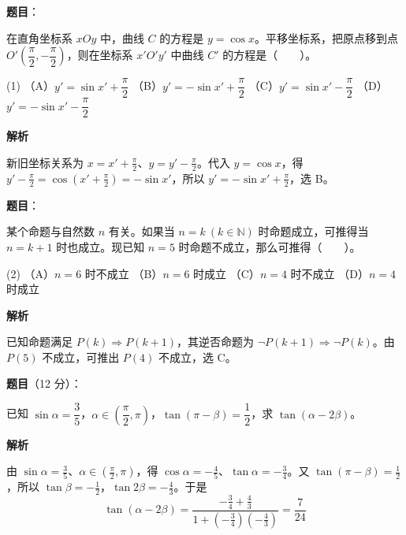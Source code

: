 \begin{answer}

\textbf{题目}：

在直角坐标系 \(xOy\) 中，曲线 \(C\) 的方程是 \(y=\cos x\)。平移坐标系，把原点移到点 \(O\prime\left(\dfrac\pi2,-\dfrac\pi2\right)\)，则在坐标系 \(x\prime O\prime y\prime\) 中曲线 \(C\prime\) 的方程是\mbox{（　　）}。

\begin{gkopts}(1)
\task （A）\(y'=\sin x'+\dfrac\pi2\)
\task （B）\(y'=-\sin x'+\dfrac\pi2\)
\task （C）\(y'=\sin x'-\dfrac\pi2\)
\task （D）\(y'=-\sin x'-\dfrac\pi2\)
\end{gkopts}

\textbf{解析}

新旧坐标关系为 \(x=x\prime+\frac\pi2\)、\(y=y\prime-\frac\pi2\)。代入 \(y=\cos x\)，得 \(y\prime-\frac\pi2=\cos(x\prime+\frac\pi2)=-\sin x\prime\)，所以 \(y\prime=-\sin x\prime+\frac\pi2\)，选 B。


\end{answer}
\begin{answer}

\textbf{题目}：

某个命题与自然数 \(n\) 有关。如果当 \(n=k\ (k\in\mathbb N)\) 时命题成立，可推得当 \(n=k+1\) 时也成立。现已知 \(n=5\) 时命题不成立，那么可推得\mbox{（　　）}。

\begin{gkopts}(2)
\task （A）\(n=6\) 时不成立
\task （B）\(n=6\) 时成立
\task （C）\(n=4\) 时不成立
\task （D）\(n=4\) 时成立
\end{gkopts}

\textbf{解析}

已知命题满足 \(P(k)\Rightarrow P(k+1)\)，其逆否命题为 \(\neg P(k+1)\Rightarrow\neg P(k)\)。由 \(P(5)\) 不成立，可推出 \(P(4)\) 不成立，选 C。


\end{answer}
\begin{answer}

\textbf{题目}（12 分）：

已知 \(\sin\alpha=\dfrac35\)，\(\alpha\in(\dfrac\pi2,\pi)\)，\(\tan(\pi-\beta)=\dfrac12\)，求 \(\tan(\alpha-2\beta)\)。

\textbf{解析}

由 \(\sin\alpha=\frac35\)、\(\alpha\in(\frac\pi2,\pi)\)，得 \(\cos\alpha=-\frac45\)、\(\tan\alpha=-\frac34\)。又 \(\tan(\pi-\beta)=\frac12\)，所以 \(\tan\beta=-\frac12\)，\(\tan2\beta=-\frac43\)。于是
\nopagebreak[4]
\[
\tan(\alpha-2\beta)=\frac{-\frac34+\frac43}{1+(-\frac34)(-\frac43)}=\frac7{24}
\]


\end{answer}
